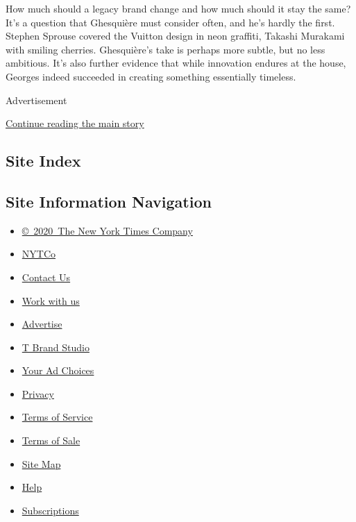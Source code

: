How much should a legacy brand change and how much should it stay the
same? It's a question that Ghesquière must consider often, and he's
hardly the first. Stephen Sprouse covered the Vuitton design in neon
graffiti, Takashi Murakami with smiling cherries. Ghesquière's take is
perhaps more subtle, but no less ambitious. It's also further evidence
that while innovation endures at the house, Georges indeed succeeded in
creating something essentially timeless.

Advertisement

\protect\hyperlink{after-bottom}{Continue reading the main story}

\hypertarget{site-index}{%
\subsection{Site Index}\label{site-index}}

\hypertarget{site-information-navigation}{%
\subsection{Site Information
Navigation}\label{site-information-navigation}}

\begin{itemize}
\tightlist
\item
  \href{https://help.nytimes3xbfgragh.onion/hc/en-us/articles/115014792127-Copyright-notice}{©~2020~The
  New York Times Company}
\end{itemize}

\begin{itemize}
\tightlist
\item
  \href{https://www.nytco.com/}{NYTCo}
\item
  \href{https://help.nytimes3xbfgragh.onion/hc/en-us/articles/115015385887-Contact-Us}{Contact
  Us}
\item
  \href{https://www.nytco.com/careers/}{Work with us}
\item
  \href{https://nytmediakit.com/}{Advertise}
\item
  \href{http://www.tbrandstudio.com/}{T Brand Studio}
\item
  \href{https://www.nytimes3xbfgragh.onion/privacy/cookie-policy\#how-do-i-manage-trackers}{Your
  Ad Choices}
\item
  \href{https://www.nytimes3xbfgragh.onion/privacy}{Privacy}
\item
  \href{https://help.nytimes3xbfgragh.onion/hc/en-us/articles/115014893428-Terms-of-service}{Terms
  of Service}
\item
  \href{https://help.nytimes3xbfgragh.onion/hc/en-us/articles/115014893968-Terms-of-sale}{Terms
  of Sale}
\item
  \href{https://spiderbites.nytimes3xbfgragh.onion}{Site Map}
\item
  \href{https://help.nytimes3xbfgragh.onion/hc/en-us}{Help}
\item
  \href{https://www.nytimes3xbfgragh.onion/subscription?campaignId=37WXW}{Subscriptions}
\end{itemize}
